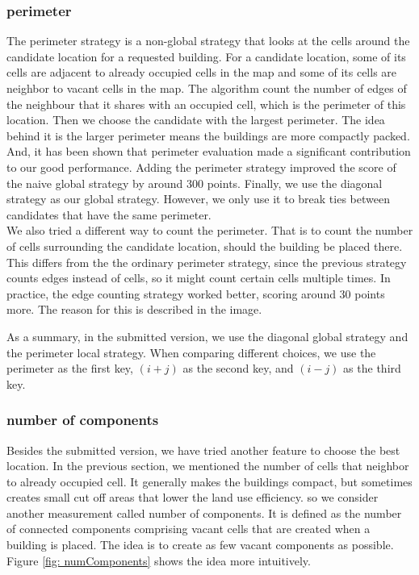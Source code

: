 \subsubsection{perimeter}
The perimeter strategy is a non-global strategy that looks at the cells around the candidate location for a requested building. For a candidate location, some of its cells are adjacent to already occupied cells in the map and some of its cells are neighbor to vacant cells in the map. The algorithm count the number of edges of the neighbour that it shares with an occupied cell, which is the perimeter of this location. Then we choose the candidate with the largest perimeter. The idea behind it is the larger perimeter means the buildings are more compactly packed. And, it has been shown that perimeter evaluation made a significant contribution to our good performance. Adding the perimeter strategy improved the score of the naive global strategy by around 300 points. 
Finally, we use the diagonal strategy as our global strategy. However, we only use it to break ties between candidates that have the same perimeter.\\
We also tried a different way to count the perimeter. That is to count the number of cells surrounding the candidate location, should the building be placed there. This differs from the the ordinary perimeter strategy, since the previous strategy counts edges instead of cells, so it might count certain cells multiple times. In practice, the edge counting strategy worked better, scoring around 30 points more. The reason for this is described in the image.

As a summary, in the submitted version, we use the diagonal global strategy and the perimeter local strategy. When comparing different choices, we use the perimeter as the first key, $(i+j)$ as the second key, and $(i-j)$ as the third key.

\subsubsection{number of components}
Besides the submitted version, we have tried another feature to choose the best location. In the previous section, we mentioned the number of cells that neighbor to already occupied cell. It generally makes the buildings compact, but sometimes creates small cut off areas that lower the land use efficiency. so we consider another measurement called number of components. It is defined as the number of connected components comprising vacant cells that are created when a building is placed. The idea is to create as few vacant components as possible. Figure \ref{fig: numComponents} shows the idea more intuitively.

